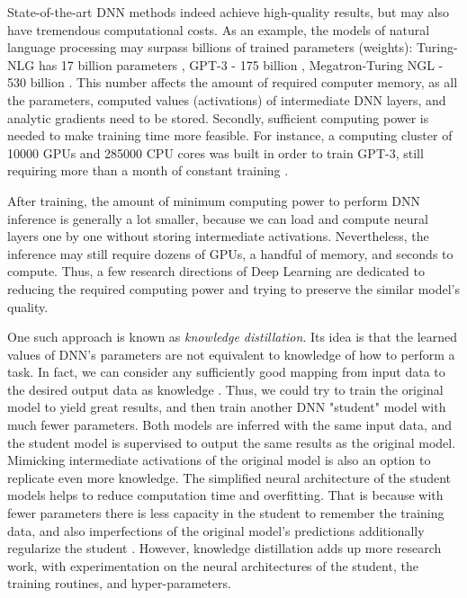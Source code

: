 State-of-the-art DNN methods indeed achieve high-quality results, but may also have tremendous computational costs. As an example, the models of natural language processing may surpass billions of trained parameters (weights): Turing-NLG has 17 billion parameters \cite{dnn:turingnlg20}, GPT-3 - 175 billion \cite{dnn:gpt3-20}, Megatron-Turing NGL - 530 billion \cite{dnn:megatron22}. This number affects the amount of required computer memory, as all the parameters, computed values (activations) of intermediate DNN layers, and analytic gradients need to be stored. Secondly, sufficient computing power is needed to make training time more feasible. For instance, a computing cluster of 10000 GPUs and 285000 CPU cores was built in order to train GPT-3, still requiring more than a month of constant training \cite{aux:openai-cluster-20}. 

After training, the amount of minimum computing power to perform DNN inference is generally a lot smaller, because we can load and compute neural layers one by one without storing intermediate activations. Nevertheless, the inference may still require dozens of GPUs, a handful of memory, and seconds to compute. Thus, a few research directions of Deep Learning are dedicated to reducing the required computing power and trying to preserve the similar model's quality.

One such approach is known as \textit{knowledge distillation}. Its idea is that the learned values of DNN's parameters are not equivalent to knowledge of how to perform a task. In fact, we can consider any sufficiently good mapping from input data to the desired output data as knowledge \cite{method:distillation15}. Thus, we could try to train the original model to yield great results, and then train another DNN "student" model with much fewer parameters. Both models are inferred with the same input data, and the student model is supervised to output the same results as the original model. Mimicking intermediate activations of the original model is also an option to replicate even more knowledge. The simplified neural architecture of the student models helps to reduce computation time and overfitting. That is because with fewer parameters there is less capacity in the student to remember the training data, and also imperfections of the original model's predictions additionally regularize the student \cite{survey:distillation21, speed:distillgan19}. However, knowledge distillation adds up more research work, with experimentation on the neural architectures of the student, the training routines, and hyper-parameters.

